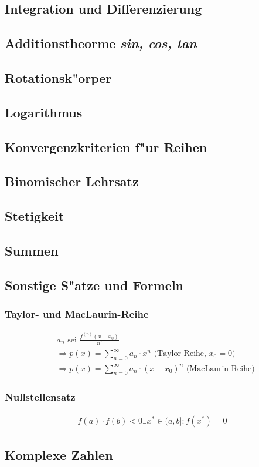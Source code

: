 \subsection{Integration und Differenzierung}


\subsection{Additionstheorme \textit{sin, cos, tan}}

\subsection{Rotationsk"orper}

\subsection{Logarithmus}

\subsection{Konvergenzkriterien f"ur Reihen}

\subsection{Binomischer Lehrsatz}

\subsection{Stetigkeit}

\subsection{Summen}

\subsection{Sonstige S"atze und Formeln}
	\subsubsection{Taylor- und MacLaurin-Reihe}
		\begin{align}
			&a_n \mbox{ sei } \frac{f^{(n)}(x-x_0)}{n!} \\
			&\Rightarrow p(x) = \sum_{n=0}^{\infty} a_n \cdot x^n \mbox{ (Taylor-Reihe, } x_0=0 \mbox{)} \\
			&\Rightarrow p(x) = \sum_{n=0}^{\infty} a_n \cdot (x-x_0)^n \mbox{ (MacLaurin-Reihe)}
		\end{align}

	\subsubsection{Nullstellensatz}
		\begin{align}
			f(a) \cdot f(b) < 0 \exists x^* \in (a, b]: f(x^*) = 0 
		\end{align}

\subsection{Komplexe Zahlen}

